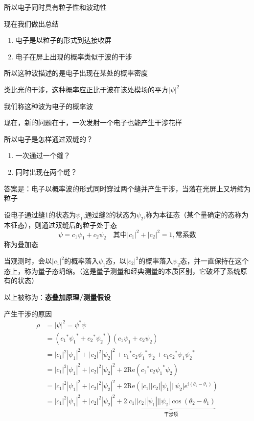 \documentclass[lang=cn,15pt]{elegantbook}
\begin{document}
所以电子同时具有粒子性和波动性

现在我们做出总结
\begin{enumerate}
	\item 电子是以粒子的形式到达接收屏
	\item 电子在屏上出现的概率类似于波的干涉
\end{enumerate}
所以这种波描述的是电子出现在某处的概率密度

类比光的干涉，这种概率应正比于波在该处模场的平方$|\psi|^2$

我们称这种波为电子的概率波

现在，新的问题在于，一次发射一个电子也能产生干涉花样

所以电子是怎样通过双缝的？
\begin{enumerate}
	\item 一次通过一个缝？
	\item 同时出现在两个缝？
\end{enumerate}
答案是：电子以概率波的形式同时穿过两个缝并产生干涉，当落在光屏上又坍缩为粒子

设电子通过缝1的状态为$\psi_1$,通过缝2的状态为$\psi_2$,称为本征态（某个量确定的态称为本征态），则通过双缝后的粒子处于态
\begin{equation}
	\psi=c_1\psi_1+c_2\psi_2\quad\text{其中}|c_1|^2+|c_2|^2=1,\text{常系数}
\end{equation}
称为叠加态

当观测时，会以$|c_1|^2$的概率落入$\psi_1$态，以$|c_2|^2$的概率落入$\psi_2$态，并一直保持在这个态上，称为量子态坍缩。（这是量子测量和经典测量的本质区别，它破坏了系统原有的状态）

以上被称为：\textbf{态叠加原理/测量假设}

产生干涉的原因
\begin{equation}
	\begin{split}
		\rho &=|\psi |^2=\psi ^*\psi 
		\\
		&=\left( {c_1}^*{\psi _1}^*+{c_2}^*{\psi _2}^* \right) \left( c_1\psi _1+c_2\psi _2 \right) 
		\\
		&=|c_1|^2|\psi _1|^2+|c_2|^2|\psi _2|^2+{c_1}^*c_2{\psi _1}^*\psi _2+c_1{c_2}^*\psi _1{\psi _2}^*
		\\
		&=|c_1|^2|\psi _1|^2+|c_2|^2|\psi _2|^2+2\mathrm{Re}\left( {c_1}^*c_2{\psi _1}^*\psi _2 \right) 
		\\
		&=|c_1|^2|\psi _1|^2+|c_2|^2|\psi _2|^2+2\mathrm{Re}\left( |c_1||c_2||\psi _1|||\psi _2|e^{i\left( \theta _2-\theta _1 \right)} \right) 
		\\
		&=|c_1|^2|\psi _1|^2+|c_2|^2|\psi _2|^2+2\underset{\text{干涉项}}{\underbrace{|c_1||c_2||\psi _1|||\psi _2|\cos \left( \theta _2-\theta _1 \right) }}
	\end{split}
\end{equation}
\end{document}
